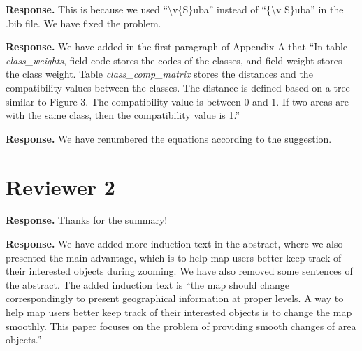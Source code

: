 \documentclass[a4paper,twoside,11pt]{reviewresponse}
\begin{document}
\textbf{Response.}
This is because we used  ``\textbackslash v\{S\}uba''
instead of ``\{\textbackslash v S\}uba'' in the .bib file.
We have fixed the problem.

\textbf{Response.}
We have added in the first paragraph of Appendix A that
``In table \emph{class\_weights}, 
field code stores the codes of the classes,
and field weight stores the class weight.
Table \emph{class\_comp\_matrix} 
stores the distances and the compatibility values between the classes.
The distance is defined based on a tree similar to Figure 3.
The compatibility value is between 0 and 1.
If two areas are with the same class, then the compatibility value is 1.''

\textbf{Response.}
We have renumbered the equations according to the suggestion.

\clearpage

\section{Reviewer 2}
\setcounter{comments}{-1} %

\textbf{Response.} 
Thanks for the summary!

\textbf{Response.}
We have added more induction text in the abstract,
where we also presented the main advantage,
which is to help map users better keep track of 
their interested objects during zooming.
We have also removed some sentences of the abstract.
The added induction text is
``the map should change correspondingly to present
geographical information at proper levels.
A way to help map users better keep track of their interested objects
is to change the map smoothly.
This paper focuses on the problem of providing smooth changes of area objects.''
\end{document}
